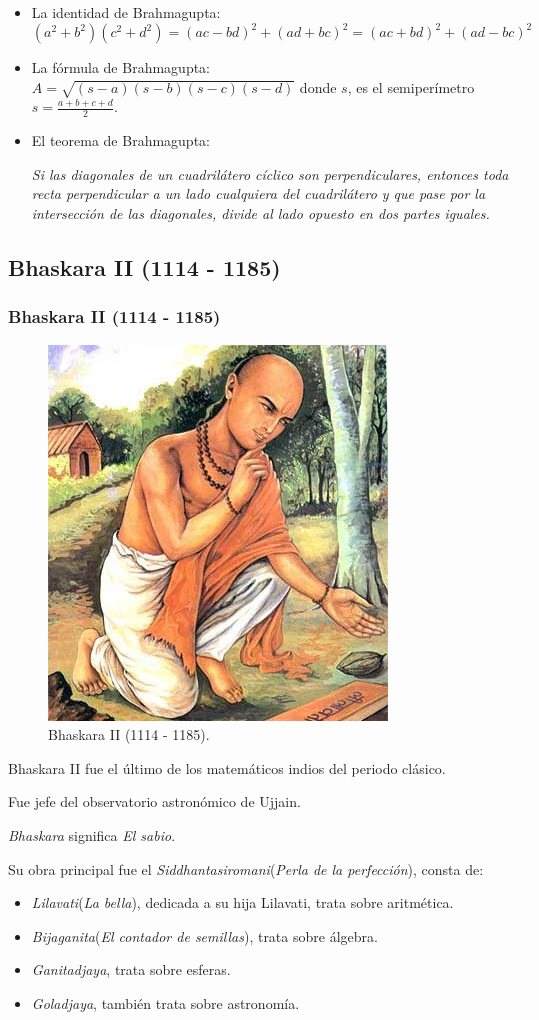 \documentclass[compress, aspectratio=169]{beamer} %
\begin{document}
		\begin{frame}
			\begin{itemize}
				\item La identidad de Brahmagupta:
				$$ (a^2 + b^2)(c^2 + d^2) =(ac - bd)^2 + (ad + bc)^2 = (ac + bd)^2 + (ad-bc)^2$$
				\item La fórmula de Brahmagupta: \\
				$\displaystyle A = \sqrt{(s - a)(s - b)(s - c)(s - d)}$ donde $s$, es el semiperímetro $\displaystyle
				s = \frac {a + b + c + d}{2}$. 
				\item El teorema de Brahmagupta:
				\begin{center}
					\em Si las diagonales de un cuadrilátero cíclico son perpendiculares, entonces toda recta perpendicular
					a un lado cualquiera del cuadrilátero y que pase por la intersección de las diagonales, divide al lado
					opuesto en dos partes iguales.
				\end{center}
			\end{itemize}
		\end{frame}

	\subsection{Bhaskara II (1114 - 1185)}
		\begin{frame}
			\frametitle{Bhaskara II (1114 - 1185)}
			\begin{figure}
				\centering
				\includegraphics[width = .3\linewidth]{bhaskara_II.jpg}
				\caption{Bhaskara II (1114 - 1185).}
			\end{figure}
		\end{frame}
		
		\begin{frame}
			Bhaskara II fue el último de los matemáticos indios del periodo clásico.
			
			Fue jefe del observatorio astronómico de Ujjain.
			
			\textit{Bhaskara} significa \textit{El sabio}.

			Su obra principal fue el \textit{Siddhantasiromani}(\textit{Perla de la perfección}), consta de:
			\begin{itemize}
				\item \textit{Lilavati}(\textit{La bella}), dedicada a su hija Lilavati, trata sobre aritmética.
				\item \textit{Bijaganita}(\textit{El contador de semillas}), trata sobre álgebra.
				\item \textit{Ganitadjaya}, trata sobre esferas.
				\item \textit{Goladjaya}, también trata sobre astronomía.
			\end{itemize}
		\end{frame}	
\end{document}
